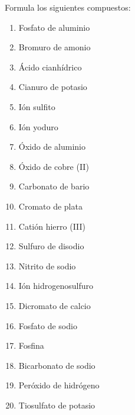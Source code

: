 \begin{prob}
Formula los siguientes compuestos:
\begin{multicols}{2}
\begin{enumerate}
	\item Fosfato de aluminio
	\item Bromuro de amonio
	\item Ácido cianhídrico
	\item Cianuro de potasio
	\item Ión sulfito
	\item Ión yoduro
	\item Óxido de aluminio
	\item Óxido de cobre (II)
	\item Carbonato de bario
	\item Cromato de plata
	\item Catión hierro (III)
	\item Sulfuro de disodio
	\item Nitrito de sodio
	\item Ión hidrogenosulfuro
	\item Dicromato de calcio
	\item Fosfato de sodio
	\item Fosfina
	\item Bicarbonato de sodio
	\item Peróxido de hidrógeno
	\item Tiosulfato de potasio 
\end{enumerate}
\end{multicols}
\end{prob}
